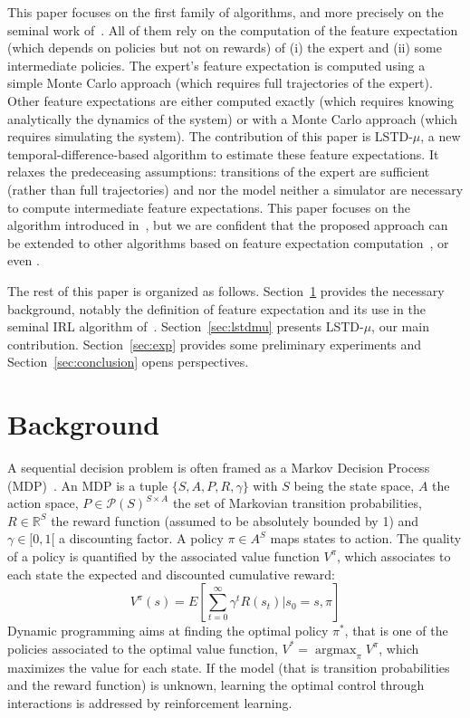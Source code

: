 \documentclass{jfpda2011}
\newcommand{\argmax}{\operatorname*{argmax}} %
\begin{document}
This paper focuses on the first family of algorithms, and more
precisely on the seminal work of~\citet{abbeel2004apprenticeship}. All of them
rely on the computation of the feature expectation (which depends on
policies but not on rewards) of (i) the expert and (ii) some
intermediate policies. The expert's feature expectation is computed
using a simple Monte Carlo approach (which requires full
trajectories of the expert). Other feature expectations are either
computed exactly (which requires knowing analytically the dynamics
of the system) or with a Monte Carlo approach (which requires simulating the system). The contribution of this paper is LSTD-$\mu$,
a new temporal-difference-based algorithm to estimate these feature
expectations. It relaxes the predeceasing assumptions: transitions
of the expert are sufficient (rather than full trajectories) and nor
the model neither a simulator are necessary to compute intermediate
feature expectations. This paper focuses on the algorithm introduced
in~\citep{abbeel2004apprenticeship}, but we are confident that the proposed
approach can be extended to other algorithms based on feature
expectation computation~\citep{syed2008apprenticeship,syed2008game,ziebart2008maximum}, or even \citep{ratliff2006maximum,ratliff2007imitation,ratliff2007boosting}.

The rest of this paper is organized as follows.
Section~\ref{sec:back} provides the necessary background,
notably the definition of feature expectation and its use in the
seminal IRL algorithm of~\citet{abbeel2004apprenticeship}.
Section~\ref{sec:lstdmu} presents LSTD-$\mu$, our main contribution.
Section~\ref{sec:exp} provides some preliminary experiments and
Section~\ref{sec:conclusion} opens perspectives.


\section{Background}
\label{sec:back}
A sequential decision problem is often framed as a Markov Decision
Process (MDP)~\citep{puterman1994markov}. An MDP is a tuple
$\{S,A,P,R,\gamma\}$ with $S$ being the state space, $A$ the action
space, $P\in\mathcal{P}(S)^{S\times A}$ the set of Markovian
transition probabilities, $R\in\mathbb{R}^S$ the reward function
(assumed to be absolutely bounded by 1) and $\gamma\in[0,1[$ a
discounting factor. A policy $\pi\in A^S$ maps states to action. The
quality of a policy is quantified by the associated value function
$V^\pi$, which associates to each state the expected and discounted
cumulative reward:
\begin{equation}
  V^\pi(s) = E[\sum_{t=0}^\infty \gamma^t R(s_t)|s_0=s, \pi]
\end{equation}
Dynamic programming aims at finding the optimal policy $\pi^*$, that
is one of the policies associated to the optimal value function,
$V^* = \argmax_\pi V^\pi$, which maximizes the value for each state.
If the model (that is transition probabilities and the reward
function) is unknown, learning the optimal control through
interactions is addressed by reinforcement learning.
\end{document}
